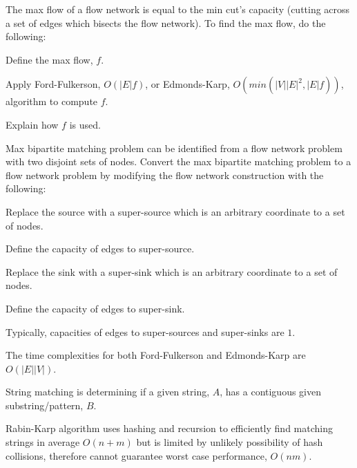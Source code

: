 
        The max flow of a flow network is equal to the min cut's capacity (cutting across a set of edges which bisects the flow network). To find the max flow, do the following:

        \startitemize[n]
            \item Define the max flow, $f$.
            \item Apply Ford-Fulkerson, $O(|E|f)$, or Edmonds-Karp, $O(min(|V||E|^{2}, |E|f))$, algorithm to compute $f$.
            \item Explain how $f$ is used.
        \stopitemize


        Max bipartite matching problem can be identified from a flow network problem with two disjoint sets of nodes. Convert the max bipartite matching problem to a flow network problem by modifying the flow network construction with the following:
        \startitemize[n]
            \item Replace the source with a super-source which is an arbitrary coordinate to a set of nodes.
            \item Define the capacity of edges to super-source.
            \item Replace the sink with a super-sink which is an arbitrary coordinate to a set of nodes.
            \item Define the capacity of edges to super-sink.
        \stopitemize

        Typically, capacities of edges to super-sources and super-sinks are $1$.

        The time complexities for both Ford-Fulkerson and Edmonds-Karp are $O(|E||V|)$.

\subject{String Matching} %

    String matching is determining if a given string, $A$, has a contiguous given substring/pattern, $B$.


        Rabin-Karp algorithm uses hashing and recursion to efficiently find matching strings in average $O(n + m)$ but is limited by unlikely possibility of hash collisions, therefore cannot guarantee worst case performance, $O(nm)$.

